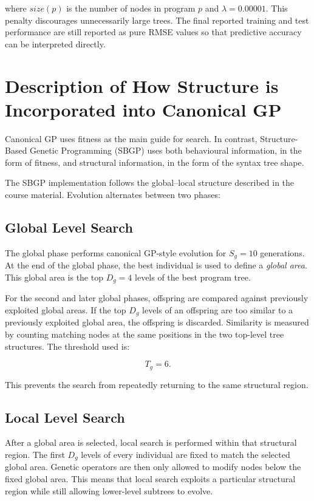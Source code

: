 \documentclass{article}
\begin{document}
where $size(p)$ is the number of nodes in program $p$ and $\lambda = 0.00001$. This penalty discourages unnecessarily large trees. The final reported training and test performance are still reported as pure RMSE values so that predictive accuracy can be interpreted directly.

\section{Description of How Structure is Incorporated into Canonical GP}

Canonical GP uses fitness as the main guide for search. In contrast, Structure-Based Genetic Programming (SBGP) uses both behavioural information, in the form of fitness, and structural information, in the form of the syntax tree shape.

The SBGP implementation follows the global--local structure described in the course material. Evolution alternates between two phases:

\subsection{Global Level Search}

The global phase performs canonical GP-style evolution for $S_g = 10$ generations. At the end of the global phase, the best individual is used to define a \textit{global area}. This global area is the top $D_g = 4$ levels of the best program tree.

For the second and later global phases, offspring are compared against previously exploited global areas. If the top $D_g$ levels of an offspring are too similar to a previously exploited global area, the offspring is discarded. Similarity is measured by counting matching nodes at the same positions in the two top-level tree structures. The threshold used is:

\begin{equation}
T_g = 6.
\end{equation}

This prevents the search from repeatedly returning to the same structural region.

\subsection{Local Level Search}

After a global area is selected, local search is performed within that structural region. The first $D_g$ levels of every individual are fixed to match the selected global area. Genetic operators are then only allowed to modify nodes below the fixed global area. This means that local search exploits a particular structural region while still allowing lower-level subtrees to evolve.
\end{document}
